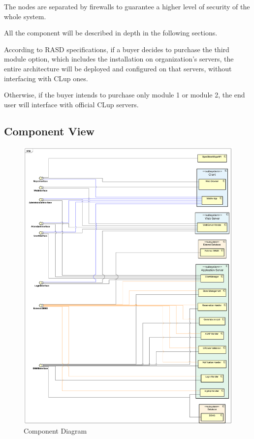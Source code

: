 \documentclass[table, 12pt]{article}
\begin{document}
The nodes are separated by firewalls to guarantee a higher level of security of the whole system.

All the component will be described in depth in the following sections.

According to RASD specifications, if a buyer decides to purchase the third module option, which includes the installation on organization's servers, the entire architecture will be deployed and configured on that servers, without interfacing with CLup ones.

Otherwise, if the buyer intends to purchase only module 1 or module 2, the end user will interface with official CLup servers.

\subsection{Component View}

\begin{figure}[H]
    \begin{center}
        \includegraphics[width=\textwidth]{assets/Architectural-Design/ComponentDiagram.png}
        \caption{Component Diagram}
        \label{component_diagram}
    \end{center}
\end{figure}
\end{document}
